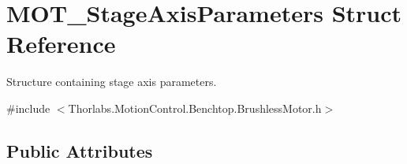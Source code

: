 \hypertarget{struct_m_o_t___stage_axis_parameters}{}\section{M\+O\+T\+\_\+\+Stage\+Axis\+Parameters Struct Reference}
\label{struct_m_o_t___stage_axis_parameters}


Structure containing stage axis parameters.  




{\ttfamily \#include $<$Thorlabs.\+Motion\+Control.\+Benchtop.\+Brushless\+Motor.\+h$>$}

\subsection*{Public Attributes}
